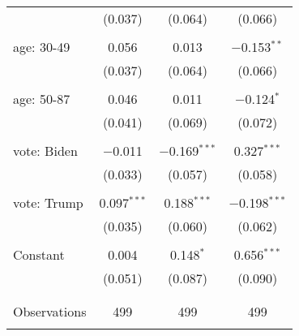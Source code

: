 \begin{tabular}{@{\extracolsep{5pt}}lccc}
  & (0.037) & (0.064) & (0.066) \\ 
  & & & \\ 
 age: 30-49 & 0.056 & 0.013 & $-$0.153$^{**}$ \\ 
  & (0.037) & (0.064) & (0.066) \\ 
  & & & \\ 
 age: 50-87 & 0.046 & 0.011 & $-$0.124$^{*}$ \\ 
  & (0.041) & (0.069) & (0.072) \\ 
  & & & \\ 
 vote: Biden & $-$0.011 & $-$0.169$^{***}$ & 0.327$^{***}$ \\ 
  & (0.033) & (0.057) & (0.058) \\ 
  & & & \\ 
 vote: Trump & 0.097$^{***}$ & 0.188$^{***}$ & $-$0.198$^{***}$ \\ 
  & (0.035) & (0.060) & (0.062) \\ 
  & & & \\ 
 Constant & 0.004 & 0.148$^{*}$ & 0.656$^{***}$ \\ 
  & (0.051) & (0.087) & (0.090) \\ 
  & & & \\ 
\hline \\[-1.8ex] 

Observations & 499 & 499 & 499 \\ 
\hline 
\hline \\[-1.8ex] 
\end{tabular} 